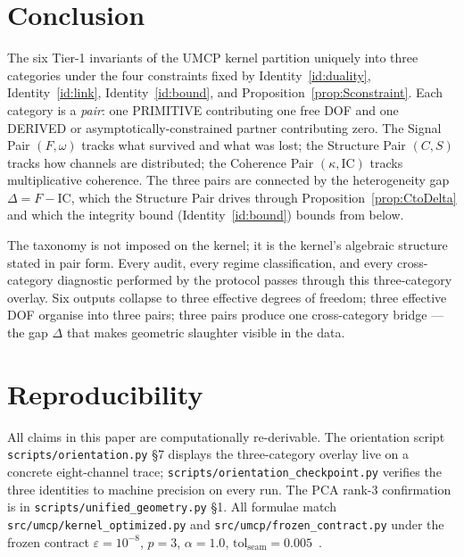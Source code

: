 \documentclass[
  aps,
  prd,
  twocolumn,
  superscriptaddress,
  nofootinbib,
  floatfix
]{revtex4-2}
\newcommand{\eps}{\varepsilon}
\newcommand{\tolseam}{\mathrm{tol}_{\mathrm{seam}}}
\newcommand{\IC}{\mathrm{IC}}
\begin{document}
\section{Conclusion}\label{sec:conclusion}

The six Tier-1 invariants of the UMCP kernel partition uniquely
into three categories under the four constraints fixed by
Identity~\ref{id:duality}, Identity~\ref{id:link},
Identity~\ref{id:bound}, and
Proposition~\ref{prop:Sconstraint}.  Each category is a
\emph{pair}: one PRIMITIVE contributing one free DOF and one
DERIVED or asymptotically-constrained partner contributing zero.
The Signal Pair $(F,\omega)$ tracks what survived and what was
lost; the Structure Pair $(C,S)$ tracks how channels are
distributed; the Coherence Pair $(\kappa,\IC)$ tracks
multiplicative coherence.  The three pairs are connected by the
heterogeneity gap $\Delta = F - \IC$, which the Structure Pair
drives through Proposition~\ref{prop:CtoDelta} and which the
integrity bound (Identity~\ref{id:bound}) bounds from below.

The taxonomy is not imposed on the kernel; it is the kernel's
algebraic structure stated in pair form.  Every audit, every
regime classification, and every cross-category diagnostic
performed by the protocol passes through this three-category
overlay.  Six outputs collapse to three effective degrees of
freedom; three effective DOF organise into three pairs; three
pairs produce one cross-category bridge --- the gap $\Delta$ that
makes geometric slaughter visible in the data.

\section*{Reproducibility}

All claims in this paper are computationally re-derivable.  The
orientation script \texttt{scripts/orientation.py} \S 7 displays
the three-category overlay live on a concrete eight-channel
trace; \texttt{scripts/orientation\_checkpoint.py} verifies the
three identities to machine precision on every run.  The PCA
rank-3 confirmation is in
\texttt{scripts/unified\_geometry.py} \S 1.  All formulae match
\texttt{src/umcp/kernel\_optimized.py} and
\texttt{src/umcp/frozen\_contract.py} under the frozen contract
$\eps=10^{-8}$, $p=3$, $\alpha=1.0$,
$\tolseam=0.005$~\cite{paulus2026umcpcasepack}.



\end{document}
